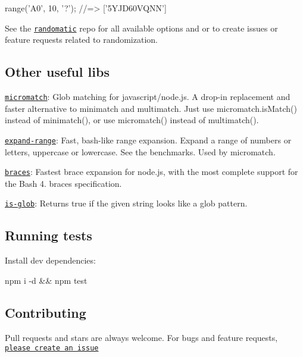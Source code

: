\begin{DoxyCode}
range('A0', 10, '?');
//=> ['5YJD60VQNN']
\end{DoxyCode}


See the \href{https://github.com/jonschlinkert/randomatic}{\tt randomatic} repo for all available options and or to create issues or feature requests related to randomization.

\subsection*{Other useful libs}


\begin{DoxyItemize}
\item \href{https://github.com/jonschlinkert/micromatch}{\tt micromatch}\+: Glob matching for javascript/node.\+js. A drop-\/in replacement and faster alternative to minimatch and multimatch. Just use {\ttfamily micromatch.\+is\+Match()} instead of {\ttfamily minimatch()}, or use {\ttfamily micromatch()} instead of {\ttfamily multimatch()}.
\item \href{https://github.com/jonschlinkert/expand-range}{\tt expand-\/range}\+: Fast, bash-\/like range expansion. Expand a range of numbers or letters, uppercase or lowercase. See the benchmarks. Used by micromatch.
\item \href{https://github.com/jonschlinkert/braces}{\tt braces}\+: Fastest brace expansion for node.\+js, with the most complete support for the Bash 4. braces specification.
\item \href{https://github.com/jonschlinkert/is-glob}{\tt is-\/glob}\+: Returns {\ttfamily true} if the given string looks like a glob pattern.
\end{DoxyItemize}

\subsection*{Running tests}

Install dev dependencies\+:


\begin{DoxyCode}
npm i -d && npm test
\end{DoxyCode}


\subsection*{Contributing}

Pull requests and stars are always welcome. For bugs and feature requests, \href{https://github.com/jonschlinkert/fill-range/issues}{\tt please create an issue}

